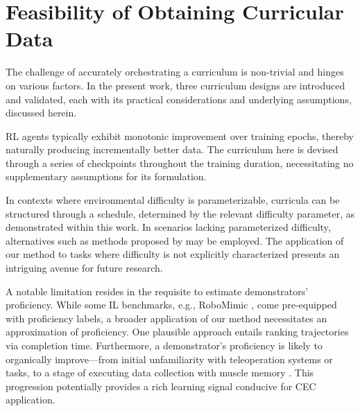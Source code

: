 \section{Feasibility of Obtaining Curricular Data}
\label{supp:sec:feasibility}

The challenge of accurately orchestrating a curriculum is non-trivial and hinges on various factors. In the present work, three curriculum designs are introduced and validated, each with its practical considerations and underlying assumptions, discussed herein.

RL agents typically exhibit monotonic improvement over training epochs, thereby naturally producing incrementally better data. The curriculum here is devised through a series of checkpoints throughout the training duration, necessitating no supplementary assumptions for its formulation.

In contexts where environmental difficulty is parameterizable, curricula can be structured through a schedule, determined by the relevant difficulty parameter, as demonstrated within this work. In scenarios lacking parameterized difficulty, alternatives such as methods proposed by \citet{kanitscheider2021multitask} may be employed. The application of our method to tasks where difficulty is not explicitly characterized presents an intriguing avenue for future research.

A notable limitation resides in the requisite to estimate demonstrators’ proficiency. While some IL benchmarks, e.g., RoboMimic \citep{mandlekar2021matters}, come pre-equipped with proficiency labels, a broader application of our method necessitates an approximation of proficiency. One plausible approach entails ranking trajectories via completion time. Furthermore, a demonstrator's proficiency is likely to organically improve—from initial unfamiliarity with teleoperation systems or tasks, to a stage of executing data collection with muscle memory \citep{mandlekar2018roboturk}. This progression potentially provides a rich learning signal conducive for CEC application.